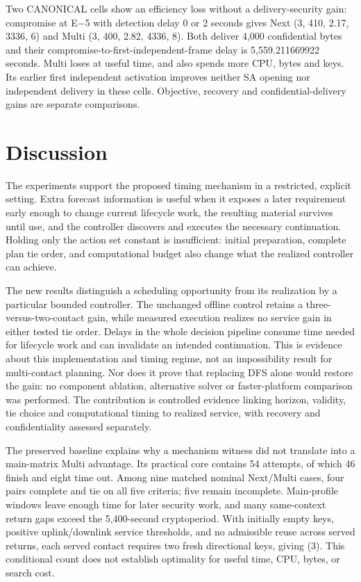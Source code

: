 \documentclass[12pt,a4paper]{article}
\begin{document}
Two CANONICAL cells show an efficiency loss without a delivery-security gain: compromise at E$-$5 with detection delay 0 or 2 seconds gives Next (3, 410, 2.17, 3336, 6) and Multi (3, 400, 2.82, 4336, 8). Both deliver 4,000 confidential bytes and their compromise-to-first-independent-frame delay is 5,559.211669922 seconds. Multi loses at useful time, and also spends more CPU, bytes and keys. Its earlier first independent activation improves neither SA opening nor independent delivery in these cells. Objective, recovery and confidential-delivery gains are separate comparisons.

\section*{Discussion}
The experiments support the proposed timing mechanism in a restricted, explicit setting. Extra forecast information is useful when it exposes a later requirement early enough to change current lifecycle work, the resulting material survives until use, and the controller discovers and executes the necessary continuation. Holding only the action set constant is insufficient: initial preparation, complete plan tie order, and computational budget also change what the realized controller can achieve.

The new results distinguish a scheduling opportunity from its realization by a particular bounded controller. The unchanged offline control retains a three-versus-two-contact gain, while measured execution realizes no service gain in either tested tie order. Delays in the whole decision pipeline consume time needed for lifecycle work and can invalidate an intended continuation. This is evidence about this implementation and timing regime, not an impossibility result for multi-contact planning. Nor does it prove that replacing DFS alone would restore the gain: no component ablation, alternative solver or faster-platform comparison was performed. The contribution is controlled evidence linking horizon, validity, tie choice and computational timing to realized service, with recovery and confidentiality assessed separately.

The preserved baseline explains why a mechanism witness did not translate into a main-matrix Multi advantage. Its practical core contains 54 attempts, of which 46 finish and eight time out. Among nine matched nominal Next/Multi cases, four pairs complete and tie on all five criteria; five remain incomplete. Main-profile windows leave enough time for later security work, and many same-context return gaps exceed the 5,400-second cryptoperiod. With initially empty keys, positive uplink/downlink service thresholds, and no admissible reuse across served returns, each served contact requires two fresh directional keys, giving (3). This conditional count does not establish optimality for useful time, CPU, bytes, or search cost.
\end{document}
